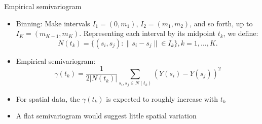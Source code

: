 \documentclass[xcolor=pdftex,dvipsnames,table,numbers,hyperref={pdfpagelabels=false},compress]{beamer}
\newcommand{\blue}[1]{{\color{RoyalBlue!90} #1}}
\begin{document}
\begin{frame}{Empirical semivariogram}
	\begin{itemize}
		\item \blue{Binning:} Make intervals $I_1=(0,m_1)$,
		$I_2=(m_1,m_2)$, and so forth, up to $I_K=(m_{K-1},m_K)$.
		Representing each interval by its midpoint $t_k$, we
		define:
		\[
		N(t_k) = \{(s_i,s_j): \|s_i - s_j\| \in I_k \},
		k=1,\ldots,K.
		\]
		\item \alert{Empirical semivariogram:}
		\[
		\gamma(t_k) = \frac{1}{2|N(t_k)|}\sum_{s_i,s_j \in
			N(t_k)}(Y(s_i)-Y(s_j))^2
		\]
		\item For spatial data, the $\gamma(t_k)$ is expected to roughly increase with $t_k$
		\item A flat semivariogram would suggest little spatial variation
	\end{itemize}
\end{frame}
\end{document}
